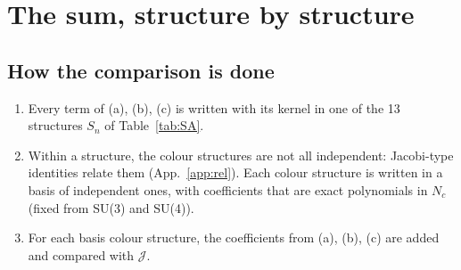 \documentclass[10pt]{article}
\numberwithin{equation}{section}
\newcommand{\J}{\mathcal J}
\begin{document}
\section{The sum, structure by structure}\label{sec:Jsum}
\subsection{How the comparison is done}
\begin{enumerate}
\item Every term of (a), (b), (c) is written with its kernel in one of the 13 structures $S_n$ of Table~\ref{tab:SA}.
\item Within a structure, the colour structures are not all independent: Jacobi-type identities relate them (App.~\ref{app:rel}). Each colour structure is written in a basis of independent ones, with coefficients that are exact polynomials in $N_c$ (fixed from SU(3) and SU(4)).
\item For each basis colour structure, the coefficients from (a), (b), (c) are added and compared with $\J$.
\end{enumerate}
\end{document}
